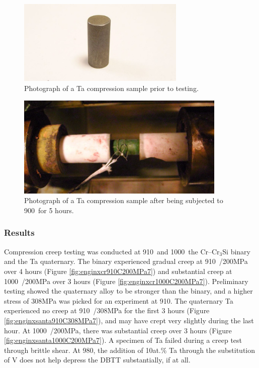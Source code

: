 %
\begin{figure}[H]
\begin{center}
\includegraphics[width=8cm]{enginxsample}
\caption{Photograph of a Ta compression sample prior to testing.}\label{fig:enginxsample}
\end{center}
\end{figure}
%

%
\begin{figure}[H]
\begin{center}
\includegraphics[width=10cm]{enginxtestedsample}
\caption{Photograph of a Ta compression sample after being subjected to 900\celsius\ for 5 hours.}\label{fig:enginxtestedsample}
\end{center}
\end{figure}
%

\subsubsection{Results}

Compression creep testing was conducted at 910\celsius\ and 1000\celsius\ the Cr--Cr$_3$Si binary and the Ta quaternary.  The binary experienced gradual creep at 910\celsius\ /200MPa over 4 hours (Figure \ref{fig:enginxcr910C200MPa7}) and substantial creep at 1000\celsius\ /200MPa over 3 hours (Figure \ref{fig:enginxcr1000C200MPa7}).  Preliminary testing showed the quaternary alloy to be stronger than the binary, and a higher stress of 308MPa was picked for an experiment at 910\celsius.  The quaternary Ta experienced no creep at 910\celsius\ /308MPa for the first 3 hours (Figure \ref{fig:enginxsanta910C308MPa7}), and may have crept very slightly during the last hour.  At 1000\celsius\ /200MPa, there was substantial creep over 3 hours (Figure \ref{fig:enginxsanta1000C200MPa7}).  A specimen of Ta failed during a creep test through brittle shear.  At 980\celsius, the addition of 10at.\% Ta through the substitution of V does not help depress the DBTT substantially, if at all. 


